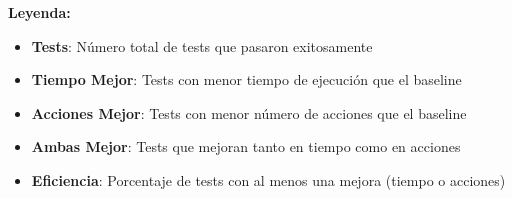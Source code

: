 
\begin{table}[h]
\centering
\caption{Comparación de Eficiencia: Tests Pasados por LLM vs Baseline}
\label{tab:eficiencia_llms}
\end{table}

\noindent \textbf{Leyenda:}
\begin{itemize}[noitemsep,topsep=0pt]
\item \textbf{Tests}: Número total de tests que pasaron exitosamente
\item \textbf{Tiempo Mejor}: Tests con menor tiempo de ejecución que el baseline
\item \textbf{Acciones Mejor}: Tests con menor número de acciones que el baseline  
\item \textbf{Ambas Mejor}: Tests que mejoran tanto en tiempo como en acciones
\item \textbf{Eficiencia}: Porcentaje de tests con al menos una mejora (tiempo o acciones)
\end{itemize}
